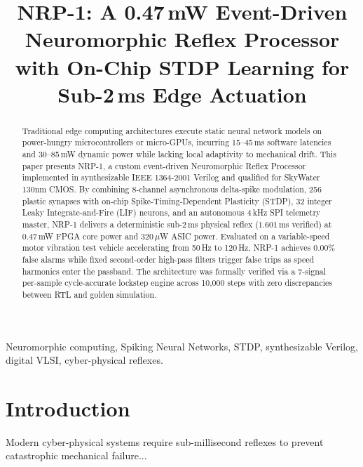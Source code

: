 \documentclass[conference]{IEEEtran}
\begin{document}
\title{NRP-1: A 0.47\,mW Event-Driven Neuromorphic Reflex Processor with On-Chip STDP Learning for Sub-2\,ms Edge Actuation}

\author{
}

\maketitle

\begin{abstract}
Traditional edge computing architectures execute static neural network models on power-hungry microcontrollers or micro-GPUs, incurring 15--45\,ms software latencies and 30--85\,mW dynamic power while lacking local adaptivity to mechanical drift. This paper presents NRP-1, a custom event-driven Neuromorphic Reflex Processor implemented in synthesizable IEEE 1364-2001 Verilog and qualified for SkyWater 130nm CMOS. By combining 8-channel asynchronous delta-spike modulation, 256 plastic synapses with on-chip Spike-Timing-Dependent Plasticity (STDP), 32 integer Leaky Integrate-and-Fire (LIF) neurons, and an autonomous 4\,kHz SPI telemetry master, NRP-1 delivers a deterministic sub-2\,ms physical reflex ($1.601\,$ms verified) at $0.47\,$mW FPGA core power and $320\,\mu$W ASIC power. Evaluated on a variable-speed motor vibration test vehicle accelerating from 50\,Hz to 120\,Hz, NRP-1 achieves 0.00\% false alarms while fixed second-order high-pass filters trigger false trips as speed harmonics enter the passband. The architecture was formally verified via a 7-signal per-sample cycle-accurate lockstep engine across 10,000 steps with zero discrepancies between RTL and golden simulation.
\end{abstract}

\begin{IEEEkeywords}
Neuromorphic computing, Spiking Neural Networks, STDP, synthesizable Verilog, digital VLSI, cyber-physical reflexes.
\end{IEEEkeywords}

\section{Introduction}
Modern cyber-physical systems require sub-millisecond reflexes to prevent catastrophic mechanical failure...
\end{document}
